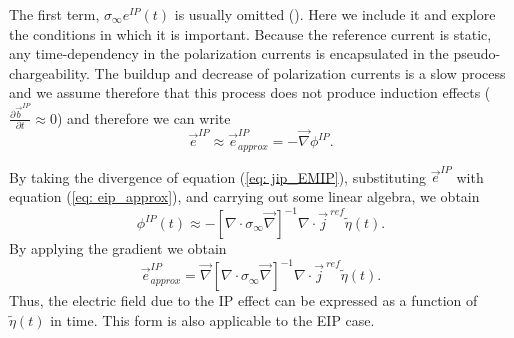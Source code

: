 \documentclass[a4paper, 11pt]{article}
\renewcommand{\div}{\nabla\cdot}
\newcommand{\grad}{\vec \nabla}
\newcommand{\siginf}{\sigma_\infty}
\renewcommand {\j}  { {\vec j} }
\renewcommand {\b}  { {\vec b} }
\newcommand {\e}  { {\vec e} }
\newcommand{\peta}{\tilde{\eta}}
\newcommand{\jref}{\j^{\ ref}}
\begin{document}
The first term, $\siginf e^{IP}(t)$ is usually omitted (\cite{Smith1988a}). Here we include it and explore the conditions in which it is important. 
Because the reference current is static, any time-dependency in the polarization currents is encapsulated in the pseudo-chargeability. The buildup and decrease of polarization currents is a slow process and we assume therefore that this process does not produce induction effects ($\frac{\partial \b^{IP}}{\partial t} \approx 0$) and therefore we can write 
\begin{equation}
  \e^{IP} \approx  \e^{IP}_{approx} = -\grad\phi^{IP}.
  \label{eq: eip_approx}
\end{equation}

By taking the divergence of  equation (\ref{eq: jip_EMIP}), substituting  $\e^{IP}$ with equation (\ref{eq: eip_approx}), and carrying out some linear algebra, we obtain
\begin{equation}
  \phi^{IP}(t) \approx -[\div \siginf\grad]^{-1}\div\jref\peta(t).
  \label{eq: phiIPapprox_general}
\end{equation}
By applying the gradient we obtain 
\begin{equation}
    \e^{IP}_{approx} = \grad[\div \siginf\grad]^{-1}\div\jref\peta(t).
    \label{eq: eip_approx_full}
\end{equation}
Thus, the electric field due to the IP effect can be expressed as a function of $\peta(t)$ in time. 
This form is also applicable to the  EIP case.   
\end{document}
